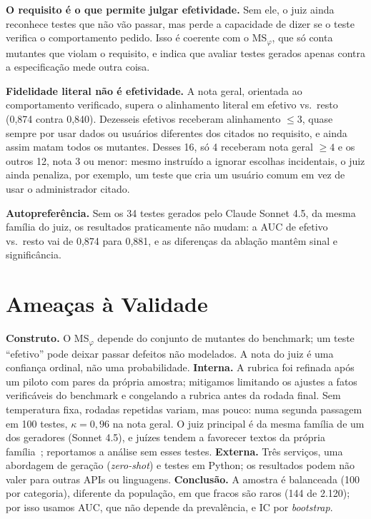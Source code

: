 \documentclass[sigconf,nonacm]{acmart}
\newcommand{\msphi}{MS$_\varphi$}
\begin{document}
\textbf{O requisito é o que permite julgar efetividade.} Sem ele, o juiz ainda reconhece testes que não vão
passar, mas perde a capacidade de dizer se o teste verifica o comportamento pedido. Isso é coerente com o
\msphi, que só conta mutantes que violam o requisito, e indica que avaliar testes gerados apenas contra a
especificação mede outra coisa.

\textbf{Fidelidade literal não é efetividade.} A nota geral, orientada ao comportamento verificado, supera o
alinhamento literal em efetivo vs.\ resto (0,874 contra 0,840). Dezesseis efetivos receberam alinhamento
$\le 3$, quase sempre por usar dados ou usuários diferentes dos citados no requisito, e ainda assim matam
todos os mutantes. Desses 16, só 4 receberam nota geral $\ge 4$ e os outros 12, nota 3 ou menor: mesmo instruído a ignorar escolhas incidentais,
o juiz ainda penaliza, por exemplo, um teste que cria um usuário comum em vez de usar o administrador citado.

\textbf{Autopreferência.} Sem os 34 testes gerados pelo Claude Sonnet 4.5, da mesma família do juiz, os
resultados praticamente não mudam: a AUC de efetivo vs.\ resto vai de 0,874 para 0,881, e as diferenças da
ablação mantêm sinal e significância.

\section{Ameaças à Validade}
\textbf{Construto.} O \msphi{} depende do conjunto de mutantes do benchmark; um teste ``efetivo'' pode deixar
passar defeitos não modelados. A nota do juiz é uma confiança ordinal, não uma probabilidade.
\textbf{Interna.} A rubrica foi refinada após um piloto com pares da própria amostra; mitigamos limitando os
ajustes a fatos verificáveis do benchmark e congelando a rubrica antes da rodada final. Sem temperatura
fixa, rodadas repetidas variam, mas pouco: numa segunda passagem em 100 testes,
$\kappa=0{,}96$ na nota geral. O juiz principal é da mesma família de um dos geradores (Sonnet 4.5), e juízes tendem a favorecer textos
da própria família~\cite{panickssery2024self};
reportamos a análise sem esses testes.
\textbf{Externa.} Três serviços, uma abordagem de geração (\emph{zero-shot}) e testes em Python; os
resultados podem não valer para outras APIs ou linguagens.
\textbf{Conclusão.} A amostra é balanceada (100 por categoria), diferente da população, em que fracos são
raros (144 de 2.120); por isso usamos AUC, que não depende da prevalência, e IC por \emph{bootstrap}.
\end{document}
